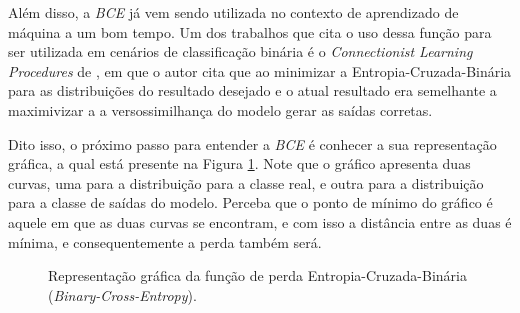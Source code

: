 Além disso, a \textit{BCE} já vem sendo utilizada no contexto de aprendizado de máquina a um bom tempo. Um dos trabalhos que cita o uso dessa função para ser utilizada em cenários de classificação binária é o \textit{Connectionist Learning Procedures} de \textcite{HintonConnectionist}, em que o autor cita que ao minimizar a Entropia-Cruzada-Binária para as distribuições do resultado desejado e o atual resultado era semelhante a maximivizar a a versossimilhança do modelo gerar as saídas corretas.

Dito isso, o próximo passo para entender a \textit{BCE} é conhecer a sua representação gráfica, a qual está presente na Figura \ref{fig:binary-cross-entropy}. Note que o gráfico apresenta duas curvas, uma para a distribuição para a classe real, e outra para a distribuição para a classe de saídas do modelo. Perceba que o ponto de mínimo do gráfico é aquele em que as duas curvas se encontram, e com isso a distância entre as duas é mínima, e consequentemente a perda também será.

\begin{figure}
    \caption{Representação gráfica da função de perda Entropia-Cruzada-Binária (\textit{Binary-Cross-Entropy}).}
    \label{fig:binary-cross-entropy}
\end{figure}

